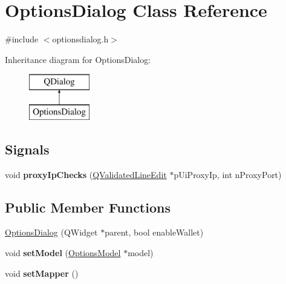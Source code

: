 \hypertarget{class_options_dialog}{}\section{Options\+Dialog Class Reference}
\label{class_options_dialog}


{\ttfamily \#include $<$optionsdialog.\+h$>$}

Inheritance diagram for Options\+Dialog\+:\begin{figure}[H]
\begin{center}
\leavevmode
\includegraphics[height=2.000000cm]{class_options_dialog}
\end{center}
\end{figure}
\subsection*{Signals}
\begin{DoxyCompactItemize}
\item 
\mbox{\label{class_options_dialog_a5dcd50233fb5279ca373060fffca6ec7}} 
void {\bfseries proxy\+Ip\+Checks} (\mbox{\hyperlink{class_q_validated_line_edit}{Q\+Validated\+Line\+Edit}} $\ast$p\+Ui\+Proxy\+Ip, int n\+Proxy\+Port)
\end{DoxyCompactItemize}
\subsection*{Public Member Functions}
\begin{DoxyCompactItemize}
\item 
\mbox{\hyperlink{class_options_dialog_ac74fd1c2837d30f6687cb1898d99f8d1}{Options\+Dialog}} (Q\+Widget $\ast$parent, bool enable\+Wallet)
\item 
\mbox{\label{class_options_dialog_a11e902a52cb7472497d14e70cd9399d9}} 
void {\bfseries set\+Model} (\mbox{\hyperlink{class_options_model}{Options\+Model}} $\ast$model)
\item 
\mbox{\label{class_options_dialog_a2088ec5bbb90ec27675f441e750e55b8}} 
void {\bfseries set\+Mapper} ()
\end{DoxyCompactItemize}
